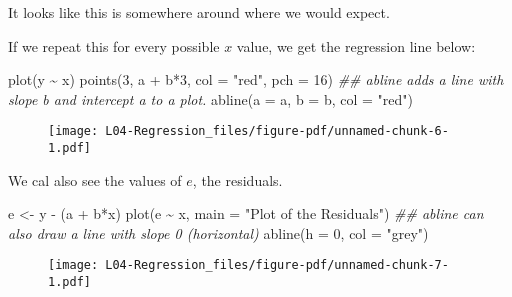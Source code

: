 \documentclass[
  letterpaper,
  DIV=11,
  numbers=noendperiod]{scrreprt}
\newenvironment{Shaded}{\begin{snugshade}}{\end{snugshade}}
\newcommand{\AttributeTok}[1]{\textcolor[rgb]{0.40,0.45,0.13}{#1}}
\newcommand{\DecValTok}[1]{\textcolor[rgb]{0.68,0.00,0.00}{#1}}
\newcommand{\DocumentationTok}[1]{\textcolor[rgb]{0.37,0.37,0.37}{\textit{#1}}}
\newcommand{\FunctionTok}[1]{\textcolor[rgb]{0.28,0.35,0.67}{#1}}
\newcommand{\NormalTok}[1]{\textcolor[rgb]{0.00,0.23,0.31}{#1}}
\newcommand{\OtherTok}[1]{\textcolor[rgb]{0.00,0.23,0.31}{#1}}
\newcommand{\SpecialCharTok}[1]{\textcolor[rgb]{0.37,0.37,0.37}{#1}}
\newcommand{\StringTok}[1]{\textcolor[rgb]{0.13,0.47,0.30}{#1}}
\begin{document}
It looks like this is somewhere around where we would expect.

If we repeat this for every possible \(x\) value, we get the regression
line below:

\begin{Shaded}
\begin{Highlighting}[]
\FunctionTok{plot}\NormalTok{(y }\SpecialCharTok{\textasciitilde{}}\NormalTok{ x)}
\FunctionTok{points}\NormalTok{(}\DecValTok{3}\NormalTok{, a }\SpecialCharTok{+}\NormalTok{ b}\SpecialCharTok{*}\DecValTok{3}\NormalTok{, }\AttributeTok{col =} \StringTok{"red"}\NormalTok{, }\AttributeTok{pch =} \DecValTok{16}\NormalTok{)}
\DocumentationTok{\#\# abline adds a line with slope b and intercept a to a plot.}
\FunctionTok{abline}\NormalTok{(}\AttributeTok{a =}\NormalTok{ a, }\AttributeTok{b =}\NormalTok{ b, }\AttributeTok{col =} \StringTok{"red"}\NormalTok{)}
\end{Highlighting}
\end{Shaded}

\begin{figure}[H]

{\centering \texttt{[image: L04-Regression\_files/figure-pdf/unnamed-chunk-6-1.pdf]}

}

\end{figure}

We cal also see the values of \(e\), the residuals.

\begin{Shaded}
\begin{Highlighting}[]
\NormalTok{e }\OtherTok{\textless{}{-}}\NormalTok{ y }\SpecialCharTok{{-}}\NormalTok{ (a }\SpecialCharTok{+}\NormalTok{ b}\SpecialCharTok{*}\NormalTok{x)}
\FunctionTok{plot}\NormalTok{(e }\SpecialCharTok{\textasciitilde{}}\NormalTok{ x, }\AttributeTok{main =} \StringTok{"Plot of the Residuals"}\NormalTok{)}
\DocumentationTok{\#\# abline can also draw a line with slope 0 (horizontal)}
\FunctionTok{abline}\NormalTok{(}\AttributeTok{h =} \DecValTok{0}\NormalTok{, }\AttributeTok{col =} \StringTok{"grey"}\NormalTok{)}
\end{Highlighting}
\end{Shaded}

\begin{figure}[H]

{\centering \texttt{[image: L04-Regression\_files/figure-pdf/unnamed-chunk-7-1.pdf]}

}

\end{figure}
\end{document}
